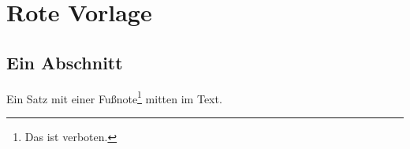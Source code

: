 \chapter{Rote Vorlage}\label{c98}

\section{Ein Abschnitt}\label{c98.s1}

Ein Satz mit einer Fußnote\footnote{Das ist verboten.} mitten im Text.
